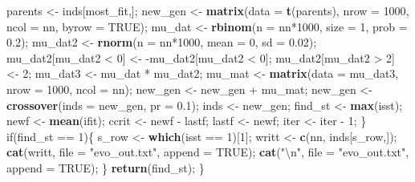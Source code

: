 \documentclass[]{article}
\newenvironment{Shaded}{\begin{snugshade}}{\end{snugshade}}
\newcommand{\KeywordTok}[1]{\textcolor[rgb]{0.13,0.29,0.53}{\textbf{{#1}}}}
\newcommand{\DataTypeTok}[1]{\textcolor[rgb]{0.13,0.29,0.53}{{#1}}}
\newcommand{\DecValTok}[1]{\textcolor[rgb]{0.00,0.00,0.81}{{#1}}}
\newcommand{\FloatTok}[1]{\textcolor[rgb]{0.00,0.00,0.81}{{#1}}}
\newcommand{\CharTok}[1]{\textcolor[rgb]{0.31,0.60,0.02}{{#1}}}
\newcommand{\StringTok}[1]{\textcolor[rgb]{0.31,0.60,0.02}{{#1}}}
\newcommand{\OtherTok}[1]{\textcolor[rgb]{0.56,0.35,0.01}{{#1}}}
\newcommand{\NormalTok}[1]{{#1}}
\begin{document}
\begin{Shaded}
\begin{Highlighting}[]
        \NormalTok{parents  <-}\StringTok{ }\NormalTok{inds[most_fit,];}
        \NormalTok{new_gen  <-}\StringTok{ }\KeywordTok{matrix}\NormalTok{(}\DataTypeTok{data =} \KeywordTok{t}\NormalTok{(parents), }\DataTypeTok{nrow =} \DecValTok{1000}\NormalTok{, }\DataTypeTok{ncol =} \NormalTok{nn, }
                           \DataTypeTok{byrow =} \OtherTok{TRUE}\NormalTok{);}
        \NormalTok{mu_dat   <-}\StringTok{ }\KeywordTok{rbinom}\NormalTok{(}\DataTypeTok{n =} \NormalTok{nn*}\DecValTok{1000}\NormalTok{, }\DataTypeTok{size =} \DecValTok{1}\NormalTok{, }\DataTypeTok{prob =} \FloatTok{0.2}\NormalTok{);}
        \NormalTok{mu_dat2  <-}\StringTok{ }\KeywordTok{rnorm}\NormalTok{(}\DataTypeTok{n =} \NormalTok{nn*}\DecValTok{1000}\NormalTok{, }\DataTypeTok{mean =} \DecValTok{0}\NormalTok{, }\DataTypeTok{sd =} \FloatTok{0.02}\NormalTok{);}
        \NormalTok{mu_dat2[mu_dat2 <}\StringTok{ }\DecValTok{0}\NormalTok{] <-}\StringTok{ }\NormalTok{-mu_dat2[mu_dat2 <}\StringTok{ }\DecValTok{0}\NormalTok{];}
        \NormalTok{mu_dat2[mu_dat2 >}\StringTok{ }\DecValTok{2}\NormalTok{] <-}\StringTok{ }\DecValTok{2}\NormalTok{;}
        \NormalTok{mu_dat3  <-}\StringTok{ }\NormalTok{mu_dat *}\StringTok{ }\NormalTok{mu_dat2;}
        \NormalTok{mu_mat   <-}\StringTok{ }\KeywordTok{matrix}\NormalTok{(}\DataTypeTok{data =} \NormalTok{mu_dat3, }\DataTypeTok{nrow =} \DecValTok{1000}\NormalTok{, }\DataTypeTok{ncol =} \NormalTok{nn);}
        \NormalTok{new_gen  <-}\StringTok{ }\NormalTok{new_gen +}\StringTok{ }\NormalTok{mu_mat;}
        \NormalTok{new_gen  <-}\StringTok{ }\KeywordTok{crossover}\NormalTok{(}\DataTypeTok{inds =} \NormalTok{new_gen, }\DataTypeTok{pr =} \FloatTok{0.1}\NormalTok{);}
        \NormalTok{inds     <-}\StringTok{ }\NormalTok{new_gen;}
        \NormalTok{find_st  <-}\StringTok{ }\KeywordTok{max}\NormalTok{(isst);}
        \NormalTok{newf     <-}\StringTok{ }\KeywordTok{mean}\NormalTok{(ifit);}
        \NormalTok{ccrit    <-}\StringTok{ }\NormalTok{newf -}\StringTok{ }\NormalTok{lastf;}
        \NormalTok{lastf    <-}\StringTok{ }\NormalTok{newf;}
        \NormalTok{iter     <-}\StringTok{ }\NormalTok{iter -}\StringTok{ }\DecValTok{1}\NormalTok{;}
    \NormalTok{\}}
    \NormalTok{if(find_st ==}\StringTok{ }\DecValTok{1}\NormalTok{)\{}
        \NormalTok{s_row <-}\StringTok{ }\KeywordTok{which}\NormalTok{(isst ==}\StringTok{ }\DecValTok{1}\NormalTok{)[}\DecValTok{1}\NormalTok{];}
        \NormalTok{writt <-}\StringTok{ }\KeywordTok{c}\NormalTok{(nn, inds[s_row,]);}
        \KeywordTok{cat}\NormalTok{(writt, }\DataTypeTok{file =} \StringTok{"evo_out.txt"}\NormalTok{, }\DataTypeTok{append =} \OtherTok{TRUE}\NormalTok{);}
        \KeywordTok{cat}\NormalTok{(}\StringTok{"}\CharTok{\textbackslash{}n}\StringTok{"}\NormalTok{, }\DataTypeTok{file =} \StringTok{"evo_out.txt"}\NormalTok{, }\DataTypeTok{append =} \OtherTok{TRUE}\NormalTok{);}
    \NormalTok{\}}
    \KeywordTok{return}\NormalTok{(find_st);}
\NormalTok{\}}
\end{Highlighting}
\end{Shaded}
\end{document}
